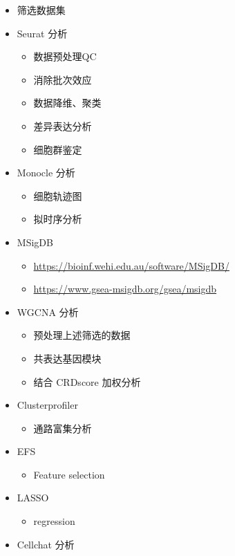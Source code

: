 \documentclass[
]{article}
\providecommand{\tightlist}{%
  \setlength{\itemsep}{0pt}\setlength{\parskip}{0pt}}
\begin{document}
\begin{itemize}
\tightlist
\item
  筛选数据集
\item
  Seurat 分析

  \begin{itemize}
  \tightlist
  \item
    数据预处理QC
  \item
    消除批次效应
  \item
    数据降维、聚类
  \item
    差异表达分析
  \item
    细胞群鉴定
  \end{itemize}
\item
  Monocle 分析

  \begin{itemize}
  \tightlist
  \item
    细胞轨迹图
  \item
    拟时序分析
  \end{itemize}
\item
  MSigDB

  \begin{itemize}
  \tightlist
  \item
    \url{https://bioinf.wehi.edu.au/software/MSigDB/}
  \item
    \url{https://www.gsea-msigdb.org/gsea/msigdb}
  \end{itemize}
\item
  WGCNA 分析

  \begin{itemize}
  \tightlist
  \item
    预处理上述筛选的数据
  \item
    共表达基因模块
  \item
    结合 CRDscore 加权分析
  \end{itemize}
\item
  Clusterprofiler

  \begin{itemize}
  \tightlist
  \item
    通路富集分析
  \end{itemize}
\item
  EFS

  \begin{itemize}
  \tightlist
  \item
    Feature selection
  \end{itemize}
\item
  LASSO

  \begin{itemize}
  \tightlist
  \item
    regression
  \end{itemize}
\item
  Cellchat 分析


\end{itemize}
\end{document}
